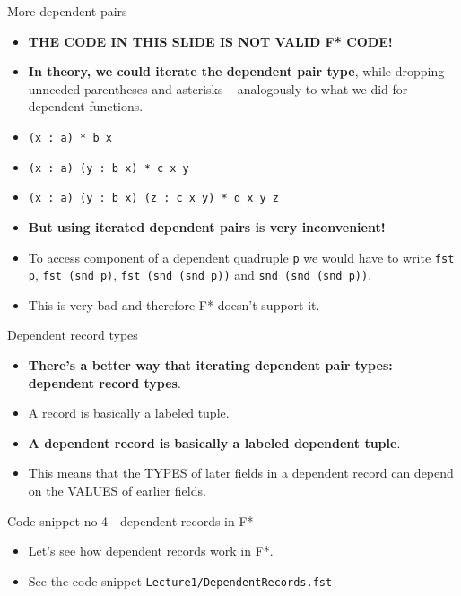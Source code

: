 \documentclass{beamer}
\newcommand{\m}[1]{\texttt{#1}}
\begin{document}
\begin{frame}{More dependent pairs}
\begin{itemize}
	\color{red}
	\item \textbf{THE CODE IN THIS SLIDE IS NOT VALID F* CODE!}
	\color{black}
	\item \textbf{In theory, we could iterate the dependent pair type}, while dropping unneeded parentheses and asterisks -- analogously to what we did for dependent functions.
	\item \m{(x :\ a) * b x}
	\item \m{(x :\ a) (y :\ b x) * c x y}
	\item \m{(x :\ a) (y :\ b x) (z :\ c x y) * d x y z}
	\item \textbf{But using iterated dependent pairs is very inconvenient!}
	\item To access component of a dependent quadruple \m{p} we would have to write \m{fst p}, \m{fst (snd p)}, \m{fst (snd (snd p))} and \m{snd (snd (snd p))}.
	\item This is very bad and therefore F* doesn't support it.
\end{itemize}
\end{frame}

\begin{frame}{Dependent record types}
\begin{itemize}
	\item \textbf{There's a better way that iterating dependent pair types: dependent record types}.
	\item A record is basically a labeled tuple.
	\item \textbf{A dependent record is basically a labeled dependent tuple}.
	\item This means that the TYPES of later fields in a dependent record can depend on the VALUES of earlier fields.
\end{itemize}
\end{frame}

\begin{frame}{Code snippet no 4 - dependent records in F*}
\begin{itemize}
	\item Let's see how dependent records work in F*.
	\item See the code snippet \m{Lecture1/DependentRecords.fst}
\end{itemize}
\end{frame}
\end{document}
